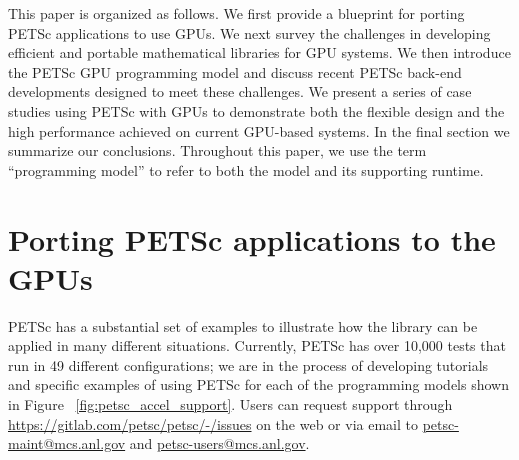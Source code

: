 \documentclass[5p,times]{elsarticle}
\begin{document}
This paper is organized as follows.
We first %
provide a blueprint for porting PETSc
applications to use GPUs. We next survey the challenges in developing efficient and portable mathematical
libraries for GPU systems.
We then introduce the PETSc GPU programming
model and discuss recent PETSc back-end developments designed to meet
these challenges.
We present a series of case studies using PETSc with GPUs to demonstrate both the 
flexible design and the high performance achieved 
on current GPU-based systems. In the final section we summarize our conclusions.
Throughout this paper, we use the term ``programming model'' to refer to
both the model and its supporting runtime.
 
\section{Porting PETSc applications to the GPUs}
\label{sec:petsc_port}



PETSc has a substantial set of examples to illustrate how the library can be applied in many
different situations.
Currently, PETSc has over 10,000 tests that run in 49 different
configurations; we are in the process of developing tutorials and specific examples  
of using PETSc for each of the programming models shown in Figure ~\ref{fig:petsc_accel_support}.
Users can request support through \url{https://gitlab.com/petsc/petsc/-/issues} on the web or via email to \url{petsc-maint@mcs.anl.gov} and \url{petsc-users@mcs.anl.gov}.

\end{document}
